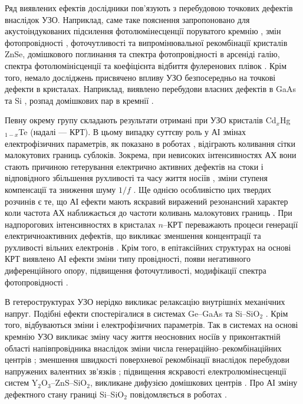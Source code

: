 Ряд виявлених ефектів дослідники пов'язують з перебудовою точкових дефектів внаслідок УЗО.
Наприклад, саме таке пояснення запропоновано для акустоіндукованих
підсилення фотолюмінесценції поруватого кремнію \cite{Bahar2003},
змін фотопровідності \cite{US:ZnSe},  фоточутливості та випромінювальної рекомбінації  \cite{ZobovFTP2008} кристалів ZnSe,
домішкового поглинання \cite{Zaver2007} та спектра фотопровідності \cite{UST:GaAs2015} в арсеніді галію,
спектра фотолюмінісценції та коефіцієнта відбиття фулеренових плівок \cite{RITTER2008}.
Крім того, немало досліджень присвячено впливу УЗО безпосередньо на точкові дефекти в кристалах.
Наприклад, виявлено перебудови  власних дефектів в GaAs \cite{Wosinski,Ostapenko1994,buyanova1994} та Si \cite{UST:Onanko},
розпад домішкових пар в кремнії \cite{Ostapenko1995SST,Ostapenko1995,Ostapenko1994APL}.


Певну окрему групу складають результати отримані при УЗО кристалів Cd$_x$Hg$_{1-x}$Te (надалі --- КРТ).
В цьому випадку суттєву роль у АІ змінах електрофізичних параметрів, як показано в роботах \cite{KRT:FTT89,KRT:FTT90}, відіграють коливання сітки малокутових границь сублоків.
Зокрема, при невисоких інтенсивностях АХ вони стають причиною гетерування електрично активних дефектів на стоки і відповідного збільшення рухливості та часу життя носіїв \cite{KRT:FTP90,Savkina:SPQEO2006}, зміни ступеня компенсації та зниження шуму $1/f$ \cite{Ol_Shav}.
Ще однією особливістю цих твердих розчинів є те, що АІ ефекти мають яскравий виражений резонансний характер коли частота АХ наближається до частоти коливань малокутових границь \cite{KRT:FTP90,KRT:FTT89,KRT:FTT90,Ol_Shav}.
При надпорогових інтенсивностях в кристалах $n$--КРТ переважають процеси генерації електричноактивних дефектів, що викликає зменшення концентрації та рухливості  вільних електронів \cite{KRT:FTP90,KRT:FTT89}.
Крім того, в епітаксійних структурах на основі КРТ виявлено АІ ефекти зміни типу провідності, появи негативного диференційного опору, підвищення фоточутливості, модифікації спектра фотопровідності \cite{Savkina:SST07,SavkinaPSSB2002}.


В гетероструктурах УЗО нерідко викликає релаксацію внутрішніх механічних напруг.
Подібні ефекти спостерігалися в системах Ge--GaAs \cite{BritunFTT,UST:GeGaAs1990} та Si--SiO$_2$ \cite{Zdeb1989}.
Крім того, відбуваються зміни і електрофізичних параметрів.
Так в системах  на основі кремнію УЗО викликає зміну часу життя неосновних носіїв у приконтактній області напівпровідника
внаслідок зміни числа генераційно--рекомбінаційних центрів \cite{Parchinskii2003r,Zdeb1989};
зменшення швидкості поверхневої рекомбінації внаслідок перебудови напружених валентних зв'язків \cite{Vlasov2009r,Parchinskii2003r};
підвищення яскравості електролюмінесценції систем Y$_2$O$_3$--ZnS--SiO$_2$, викликане дифузією домішкових центрів \cite{UST:ZnS}.
Про АІ зміну дефектного стану границі Si--SiO$_2$ повідомляється в роботах \cite{Ostap:SiO2,UST:Medvid}.


